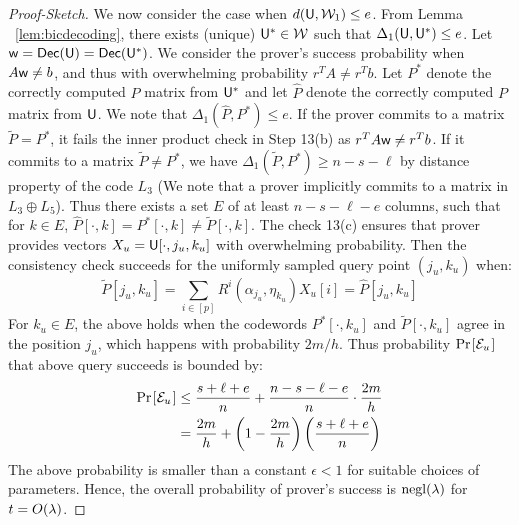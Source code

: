 \begin{proof}[Proof-Sketch]
We now consider the case when $d(\mathsf{U},\mathcal{W}_1)\leq e$. From Lemma
~\ref{lem:bicdecoding}, there exists (unique) $\mathsf{U}^*\in \mathcal{W}$
such that $\Delta_1(\mathsf{U},\mathsf{U}^*)\leq e$.
Let $\mathsf{w}=\mathsf{Dec}(\mathsf{U})=\mathsf{Dec}(\mathsf{U}^*)$. We consider the prover's success
probability when $A\mathsf{w}\neq b$, and thus with overwhelming probability $r^TA\neq
r^Tb$. Let $P^*$ denote the correctly computed $P$ matrix from $\mathsf{U}^*$ and let
$\hat{P}$ denote the correctly computed $P$ matrix from $\mathsf{U}$. We note that
$\Delta_1(\hat{P},P^*)\leq e$. If the 
prover commits to a matrix $\tilde{P}=P^*$, it fails the inner product check in Step
13(b) as $r^TA\mathsf{w}\neq r^Tb$. If it commits to a matrix $\tilde{P}\neq P^*$, we have
$\Delta_1(\tilde{P},P^*)\geq n-s-\ell$ by distance property of the code $L_3$
(We note that a prover implicitly commits to a matrix in $L_3\oplus L_5$).
Thus there exists a set $E$ of at least $n-s-\ell-e$ columns, such that for
$k\in E$, $\hat{P}[\cdot,k]=P^*[\cdot,k]\neq \tilde{P}[\cdot,k]$. The check
 13(c) ensures that prover provides vectors $X_u=\mathsf{U}[\cdot,j_u,k_u]$ with
overwhelming probability. Then the consistency check succeeds for the 
uniformly sampled query point $(j_u,k_u)$ when:
\[ \tilde{P}[j_u,k_u] = \sum_{i\in [p]}R^i(\alpha_{j_u},\eta_{k_u})X_u[i] =
\hat{P}[j_u,k_u] \]
For $k_u\in E$, the above holds when the codewords $P^*[\cdot,k_u]$ and
$\tilde{P}[\cdot,k_u]$ agree in the position $j_u$, which happens with 
probability $2m/h$. Thus probability $\prob{\mc{E}_u}$ that above query succeeds is bounded by:
{\small
\begin{align*}
\prob{\mc{E}_u}&\leq \frac{s+\ell+e}{n} + \frac{n-s-\ell-e}{n}\cdot\frac{2m}{h}
\\
&= \frac{2m}{h}+\left(1-\frac{2m}{h}\right)\left(\frac{s+\ell+e}{n}\right)
\end{align*}
}
The above probability is smaller than a constant $\epsilon<1$ for suitable
choices of parameters. Hence, the overall probability of prover's success is
$\mathrm{negl}(\lambda)$ for $t=O(\lambda)$.
\end{proof}
